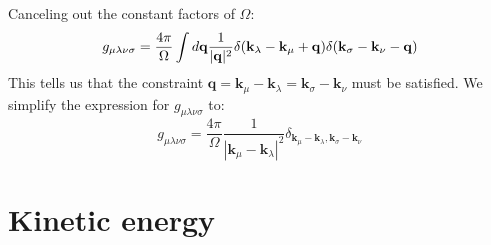 \documentclass[12pt]{article}
\begin{document}
Canceling out the constant factors of $\Omega $:
\begin{equation}
    g_{\mu\lambda\nu\sigma} = \frac{4\pi}{\Omega } \int d\mathbf{q} \frac{1}{|\vb{q}|^2} \delta(\mathbf{k}_\lambda - \mathbf{k}_\mu + \mathbf{q}) \delta(\mathbf{k}_\sigma - \mathbf{k}_\nu - \mathbf{q})
\end{equation}
This tells us that the constraint $\mathbf{q} = \mathbf{k}_\mu - \mathbf{k}_\lambda = \mathbf{k}_\sigma - \mathbf{k}_\nu$ must be satisfied. We simplify the expression for $g_{\mu\lambda\nu\sigma}$ to:
\begin{equation}
    g_{\mu\lambda\nu\sigma} = \frac{4\pi}{\Omega } \frac{1}{|\mathbf{k}_\mu - \mathbf{k}_\lambda|^2} \delta_{\mathbf{k}_\mu - \mathbf{k}_\lambda, \mathbf{k}_\sigma - \mathbf{k}_\nu}
\end{equation}



\section{Kinetic energy}
\end{document}
